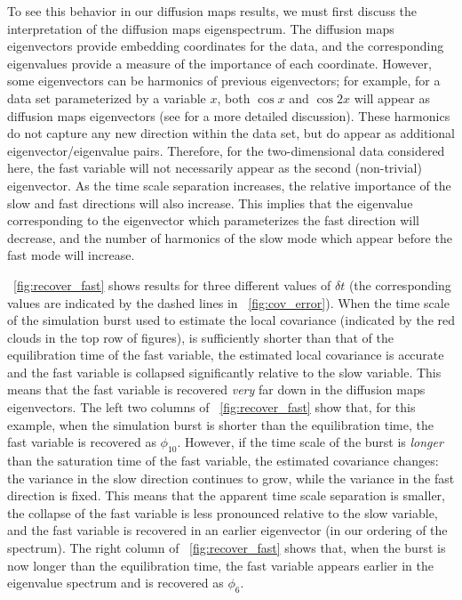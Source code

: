 To see this behavior in our diffusion maps results, we must first discuss the interpretation of the diffusion maps eigenspectrum.
%
The diffusion maps eigenvectors provide embedding coordinates for the data, and the corresponding eigenvalues provide a measure of the importance of each coordinate.
%
However, some eigenvectors can be harmonics of previous eigenvectors; for example, for a data set parameterized by a variable $x$, both $\cos x$ and $\cos 2x$ will appear as diffusion maps eigenvectors (see \cite{ferguson2010systematic} for a more detailed discussion).
%
These harmonics do not capture any new direction within the data set, but do appear as additional eigenvector/eigenvalue pairs.
%
Therefore, for the two-dimensional data considered here, the fast variable will not necessarily appear as the second (non-trivial) eigenvector.
%
As the time scale separation increases, the relative importance of the slow and fast directions will also increase.
%
This implies that the eigenvalue corresponding to the eigenvector which parameterizes the fast direction will decrease, and the number of harmonics of the slow mode which appear before the fast mode will increase.

\fig~\ref{fig:recover_fast} shows results for three different values of $\delta t$ (the corresponding values are indicated by the dashed lines in \fig~\ref{fig:cov_error}).
%
When the time scale of the simulation burst used to estimate the local covariance (indicated by the red clouds in the top row of figures), is sufficiently shorter than that of the equilibration time of the fast variable, the estimated local covariance is accurate and the fast variable is collapsed significantly relative to the slow variable.
%
This means that the fast variable is recovered {\em very} far down in the diffusion maps eigenvectors.
%
The left two columns of \fig~\ref{fig:recover_fast} show that, for this example, when the simulation burst is shorter than the equilibration time, the fast variable is recovered as $\phi_{10}$.
%
However, if the time scale of the burst is {\em longer} than the saturation time of the fast variable, the estimated covariance changes: the variance in the slow direction continues to grow, while the variance in the fast direction is fixed.
%
This means that the apparent time scale separation is smaller, the collapse of the fast variable is less pronounced relative to the slow variable, and the fast variable is recovered in an earlier eigenvector (in our ordering of the spectrum).
%
The right column of \fig~\ref{fig:recover_fast} shows that, when the burst is now longer than the equilibration time, the fast variable appears earlier in the eigenvalue spectrum and is recovered as $\phi_6$.

